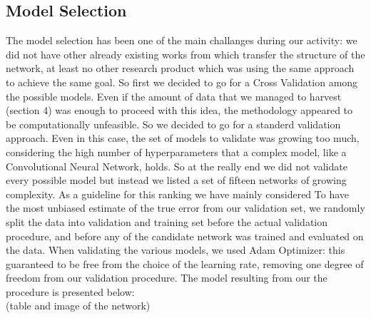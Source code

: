 \subsection{Model Selection}
The model selection has been one of the main challanges during our activity: we did not have other already existing works from which transfer the structure of the network, at least no other research product which was using the same approach to achieve the same goal. So first we decided to go for a Cross Validation among the possible models. Even if the amount of data that we managed to harvest (section 4) was enough to proceed with this idea, the methodology appeared to be computationally unfeasible. So we decided to go for a standerd validation approach. Even in this case, the set of models to validate was growing too much, considering the high number of hyperparameters that a complex model, like a Convolutional Neural Network, holds. So at the really end we did not validate every possible model but instead we listed a set of fifteen networks of growing complexity. As a guideline for this ranking we have mainly considered 
To have the most unbiased estimate of the true error from our validation set, we randomly split the data into validation and training set before the actual validation procedure, and before any of the candidate network was trained and evaluated on the data.
When validating the various models, we used Adam Optimizer: this guaranteed to be free from the choice of the learning rate, removing one degree of freedom from our validation procedure.
The model resulting from our the procedure is presented below:\\

(table and image of the network)\\

